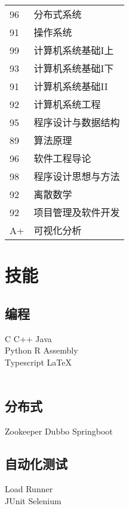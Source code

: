 \documentclass[]{deedy-resume-openfont}
\begin{document}
\begin{minipage}[t]{0.25\textwidth}
\begin{tabular}{ll}
96  & 分布式系统 \\
91  & 操作系统 \\
99  & 计算机系统基础I上 \\
93  & 计算机系统基础I下 \\
91  & 计算机系统基础II \\
92  & 计算机系统工程 \\
95  & 程序设计与数据结构 \\
89  & 算法原理 \\
96  & 软件工程导论 \\
98  & 程序设计思想与方法 \\
92  & 离散数学 \\
92  & 项目管理及软件开发 \\
A+  & 可视化分析 \\
\end{tabular}
\sectionsep


\section{技能}
\sectionsep
\subsection{编程}
C  \textbullet{} C++ \textbullet{} Java \\
Python \textbullet{}R \textbullet{} Assembly \\
Typescript  \textbullet{} \LaTeX\\\ 

\sectionsep
\subsection{分布式}
Zookeeper \textbullet{} Dubbo \textbullet{} Springboot\\
\sectionsep

\sectionsep
\subsection{自动化测试}
Load Runner \\
JUnit \textbullet{} Selenium\\
\sectionsep
%
%

\end{minipage} 
\end{document}
